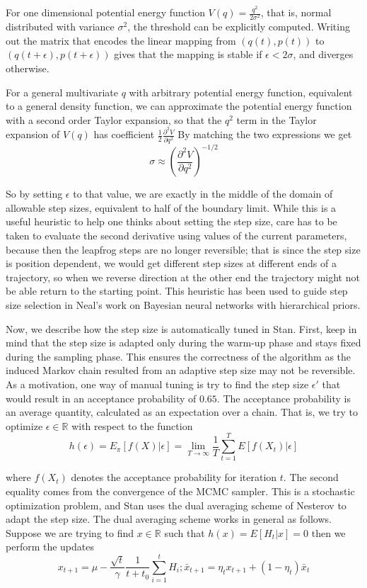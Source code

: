 \documentclass[12pt]{report}
\begin{document}
For one dimensional potential energy function $V(q) = \frac{q^2}{2\sigma^2}$,
that is, normal distributed with variance $\sigma^2$, the threshold can be explicitly computed. Writing out the matrix that encodes the linear mapping from $(q(t),p(t))$ to $(q(t+\epsilon),p(t+\epsilon))$ gives that the mapping is stable if $\epsilon < 2 \sigma$, and diverges otherwise. 

For a general multivariate $q$ with arbitrary potential energy function, equivalent to a general density function, we can approximate the potential energy function with a second order Taylor expansion, so that the $q^2$ term in the Taylor expansion of $V(q)$ has coefficient $\frac{1}{2} \frac{\partial^2 V}{\partial q^2}$  
By matching the two expressions we get 
\[ \sigma \approx ( \frac{\partial^2 V}{\partial q^2})^{-1/2} \]

So by setting $\epsilon$ to that value, we are exactly in the middle of the domain of allowable step sizes, equivalent to half of the boundary limit. While this is a useful heuristic to help one thinks about setting the step size,
care has to be taken to evaluate the second derivative using values of the current parameters, because then the leapfrog steps are no longer reversible; that is since the step size is position dependent, we would get different step sizes at different ends of a trajectory, so when we reverse direction at the other end the trajectory might not be able return to the starting point. This heuristic has been used to guide step size selection in Neal's work on Bayesian neural networks with hierarchical priors.

Now, we describe how the step size is automatically tuned in Stan. First, keep
in mind that the step size is adapted only during the warm-up phase and stays
fixed during the sampling phase. This ensures the correctness of the algorithm
as the induced Markov chain resulted from an adaptive step size may not be
reversible. As a motivation, one way of manual tuning is try to find the step size
$\epsilon'$ that would result in an acceptance probability of $0.65$. The
acceptance probability is an average quantity, calculated as an expectation
over a chain. That is, we try to optimize $\epsilon \in \mathbb{R}$ with respect
to the function 
\[ h(\epsilon) = E_\pi[f(X)|\epsilon]  = \lim_{T \rightarrow \infty} \frac{1}{T}
\sum_{t=1}^T E[f(X_t)|\epsilon] \]

where $f(X_t)$ denotes the acceptance probability for iteration $t$. The
second equality comes from the convergence of the MCMC sampler. This is a
stochastic optimization problem, and Stan uses the dual averaging scheme of
Nesterov to adapt the step size. The dual averaging scheme works in general as
follows. Suppose we are trying to find $x\in \mathbb{R}$ such that $h(x) =
E[H_t|x] = 0$ then we perform the updates 
\[x_{t+1}  = \mu - \frac{\sqrt{t}}{\gamma} \frac{1}{t+t_0} \sum_{i=1}^tH_i;
\bar{x}_{t+1} = \eta_t x_{t+1} + (1-\eta_t) \bar{x}_t \]
\end{document}
